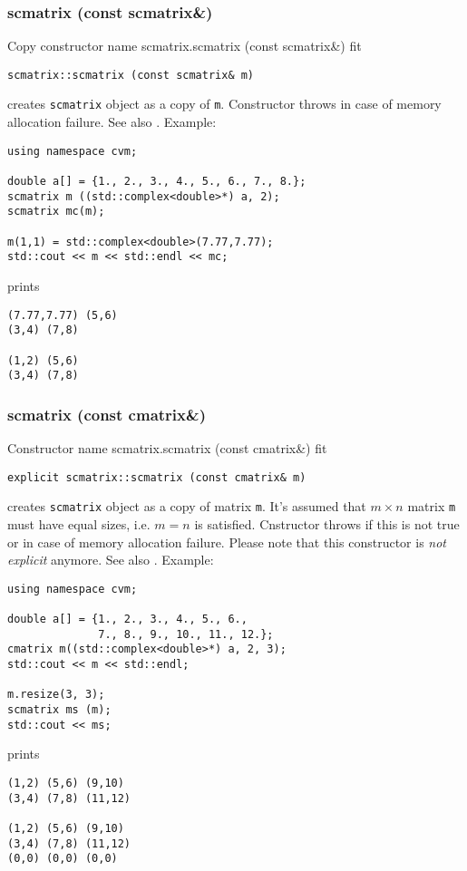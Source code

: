\subsubsection{scmatrix (const scmatrix\&)}
Copy constructor%
\pdfdest name {scmatrix.scmatrix (const scmatrix&)} fit
\begin{verbatim}
scmatrix::scmatrix (const scmatrix& m)
\end{verbatim}
creates  \verb"scmatrix" object as a copy of \verb"m".
Constructor throws  
in case of memory allocation failure.
See also .
Example:
\begin{Verbatim}
using namespace cvm;

double a[] = {1., 2., 3., 4., 5., 6., 7., 8.};
scmatrix m ((std::complex<double>*) a, 2);
scmatrix mc(m);

m(1,1) = std::complex<double>(7.77,7.77);
std::cout << m << std::endl << mc;
\end{Verbatim}
prints
\begin{Verbatim}
(7.77,7.77) (5,6)
(3,4) (7,8)

(1,2) (5,6)
(3,4) (7,8)
\end{Verbatim}
\newpage





\subsubsection{scmatrix (const cmatrix\&)}
Constructor%
\pdfdest name {scmatrix.scmatrix (const cmatrix&)} fit
\begin{verbatim}
explicit scmatrix::scmatrix (const cmatrix& m)
\end{verbatim}
creates  \verb"scmatrix" object as a copy of matrix \verb"m".
It's assumed that $m\times n$ matrix \verb"m" must have equal
sizes, i.e. $m = n$ is satisfied.
Cnstructor throws  
if this is not true or in case of memory allocation failure.
Please note that this constructor is \emph{not explicit} anymore.
See also .
Example:
\begin{Verbatim}
using namespace cvm;

double a[] = {1., 2., 3., 4., 5., 6.,
              7., 8., 9., 10., 11., 12.};
cmatrix m((std::complex<double>*) a, 2, 3);
std::cout << m << std::endl;

m.resize(3, 3);
scmatrix ms (m);
std::cout << ms;
\end{Verbatim}
prints
\begin{Verbatim}
(1,2) (5,6) (9,10)
(3,4) (7,8) (11,12)

(1,2) (5,6) (9,10)
(3,4) (7,8) (11,12)
(0,0) (0,0) (0,0)
\end{Verbatim}
\newpage




